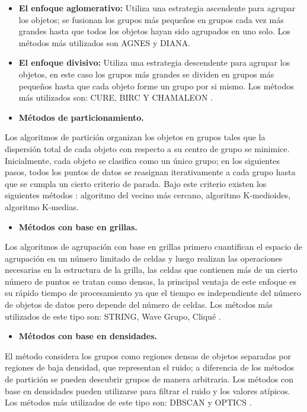 \documentclass[
]{book}
\providecommand{\tightlist}{%
  \setlength{\itemsep}{0pt}\setlength{\parskip}{0pt}}
\begin{document}
\begin{itemize}
\item
  \textbf{El enfoque aglomerativo:}
  Utiliza una estrategia ascendente para agrupar los objetos; se fusionan los grupos más pequeños en grupos cada vez más grandes hasta que todos los objetos hayan sido agrupados en uno solo. Los métodos más utilizados son AGNES y DIANA.
\item
  \textbf{El enfoque divisivo:}
  Utiliza una estrategia descendente para agrupar los objetos, en este caso los grupos más grandes se dividen en grupos más pequeños hasta que cada objeto forme un grupo por si mismo. Los métodos más utilizados son: CURE, BIRC Y CHAMALEON \citep{ritu}.
\item
  \textbf{Métodos de particionamiento.}
\end{itemize}

Los algoritmos de partición organizan los objetos en grupos tales que la dispersión total de cada objeto con respecto a su centro de grupo se minimice. Inicialmente, cada objeto se clasifica como un único grupo; en los siguientes pasos, todos los puntos de datos se reasignan iterativamente a cada grupo hasta que se cumpla un cierto criterio de parada. Bajo este criterio existen los siguientes métodos \citep{sumati}: algoritmo del vecino más cercano, algoritmo K-medioides, algoritmo K-medias.

\begin{itemize}
\tightlist
\item
  \textbf{Métodos con base en grillas.}
\end{itemize}

Los algoritmos de agrupación con base en grillas primero cuantifican el espacio de agrupación en un número limitado de celdas y luego realizan las operaciones necesarias en la estructura de la grilla, las celdas que contienen más de un cierto número de puntos se tratan como densas, la principal ventaja de este enfoque es su rápido tiempo de procesamiento ya que el tiempo es independiente del número de objetos de datos pero depende del número de celdas. Los métodos más utilizados de este tipo son: STRING, Wave Grupo, Cliqué \citep{sumati}.

\begin{itemize}
\tightlist
\item
  \textbf{Métodos con base en densidades.}
\end{itemize}

El método considera los grupos como regiones densas de objetos separadas por regiones de baja densidad, que representan el ruido; a diferencia de los métodos de partición se pueden descubrir grupos de manera arbitraria. Los métodos con base en densidades pueden utilizarse para filtrar el ruido y los valores atípicos. Los métodos más utilizados de este tipo son: DBSCAN y OPTICS \citep{sumati}.
\end{document}
